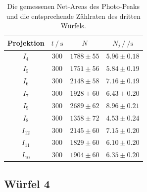 \begin{table}[H]
  \centering
  \begin{tabular}{c c c c}
    \toprule
    Projektion &  $t \:/\: \si{\second}$ &     $N$ &           $N_j \:/\: \si{\per\second}$ \\
    \midrule
             $I_{ 4}$ &   $300$ & $1788 \pm   55$ & $5.96\pm0.18$ \\
             $I_{ 5}$ &   $300$ & $1751 \pm   56$ & $5.84\pm0.19$ \\
             $I_{ 6}$ &   $300$ & $2148 \pm   58$ & $7.16\pm0.19$ \\
             $I_{ 7}$ &   $300$ & $1928 \pm   60$ & $6.43\pm0.20$ \\
             $I_{ 9}$ &   $300$ & $2689 \pm   62$ & $8.96\pm0.21$ \\
             $I_{ 8}$ &   $300$ & $1358 \pm   72$ & $4.53\pm0.24$ \\
             $I_{12}$ &   $300$ & $2145 \pm   60$ & $7.15\pm0.20$ \\
             $I_{11}$ &   $300$ & $1829 \pm   60$ & $6.10\pm0.20$ \\
             $I_{10}$ &   $300$ & $1904 \pm   60$ & $6.35\pm0.20$ \\
    \bottomrule
  \end{tabular}
  \caption{Die gemessenen Net-Areas des Photo-Peaks und die entsprechende Zählraten des dritten Würfels. }
  \label{tab:w3}
\end{table}

\subsection{Würfel 4}


